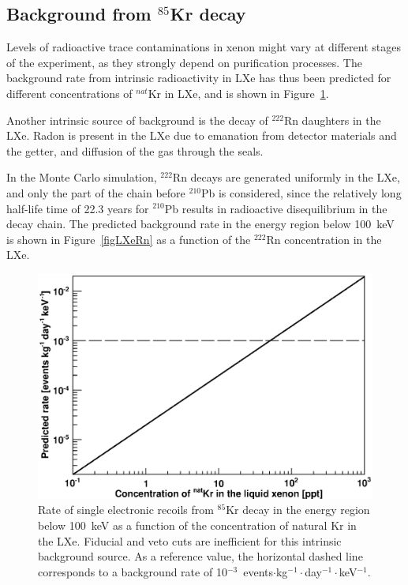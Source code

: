 \subsection{Background from $^{85}$Kr decay}

Levels of radioactive trace contaminations in xenon might vary at different stages of the experiment, as they strongly depend on purification processes. The background rate from intrinsic radioactivity in LXe has thus been predicted for different  concentrations of $^{nat}$Kr in LXe, and is shown in Figure~\ref{figLXeKr}.

Another intrinsic source of background is the decay of $^{222}$Rn daughters in the LXe. Radon is present in the LXe due to emanation from detector materials and the getter, and diffusion of the gas  through the seals. 

In the Monte Carlo simulation, $^{222}$Rn decays are generated uniformly in the LXe, and only the part of the chain before $^{210}$Pb is considered, since the relatively long half-life time of 22.3 years for $^{210}$Pb results in radioactive disequilibrium in the decay chain.
The predicted background rate in the energy region below 100~keV is shown in Figure~\ref{figLXeRn} as a function of the $^{222}$Rn concentration in the LXe.

\begin{figure}[!h]
\includegraphics[width=0.7\linewidth]{plots/Kr85/Kr85_Rate-vs-Conc.eps}
\caption[Rate of single electronic recoils from $^{85}$Kr decay]{Rate of single electronic recoils from $^{85}$Kr decay in the energy region below 100~keV as a function of the concentration of natural Kr in the LXe. Fiducial and veto cuts are inefficient for this intrinsic background source. As a reference value, the horizontal dashed line corresponds to a background rate of 10$^{-3}$~events$\cdot$kg$^{-1}\cdot$day$^{-1}\cdot$keV$^{-1}$. }
\label{figLXeKr}
\end{figure}



